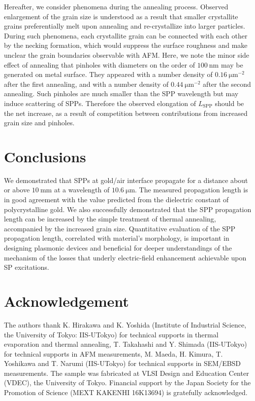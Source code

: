 \documentclass[aip,apl,reprint]{revtex4-1}
\begin{document}
Hereafter, we consider phenomena during the annealing process.
Observed enlargement of the grain size is understood as a result that smaller crystallite grains preferentially melt upon annealing\cite{Buffat} and re-crystallize into larger particles. 
During such phenomena, each crystallite grain can be connected with each other by the necking formation, which would suppress the surface roughness and make unclear the grain boundaries observable with AFM. Here, we note the minor side effect of annealing that pinholes with diameters on the order of $100\:\mathrm{nm}$ may be generated on metal surface. They appeared with a number density of $0.16\:\mathrm{\mu m}^{-2}$ after the first annealing, and with a number density of $0.44\:\mathrm{\mu m}^{-2}$ after the second annealing. Such pinholes are much smaller than the SPP wavelength but may induce scattering of SPPs. Therefore the observed elongation of $L_{\mathrm{SPP}}$ should be the net increase, as a result of competition between contributions from increased grain size and pinholes.
	
\section{Conclusions}
\label{sec:conclusion}
We demonstrated that SPPs at gold/air interface propagate for a distance about or above $10\:\mathrm{mm}$ at a wavelength of $10.6\:\mathrm{\mu m}$. The measured propagation length is in good agreement with the value predicted from the dielectric constant of polycrystalline gold. We also successfully demonstrated that the SPP propagation length can be increased by the simple treatment of thermal annealing, accompanied by the increased grain size. Quantitative evaluation of the SPP propagation length, correlated with material's morphology, is important in designing plasmonic devices and beneficial for deeper understandings of the mechanism of the losses that underly electric-field enhancement achievable upon SP excitations.

\section*{Acknowledgement}
The authors thank K. Hirakawa and K. Yoshida (Institute of Industrial Science, the University of Tokyo: IIS-UTokyo) for technical supports in thermal evaporation and thermal annealing, T. Takahashi and Y. Shimada (IIS-UTokyo) for technical supports in AFM measurements, M. Maeda, H. Kimura, T. Yoshikawa and T. Narumi (IIS-UTokyo) for technical supports in SEM/EBSD measurements.
The sample was fabricated at VLSI Design and Education Center (VDEC), the University of Tokyo. Financial support by the Japan Society for the Promotion of Science (MEXT KAKENHI 16K13694) is gratefully acknowledged.


\end{document}
